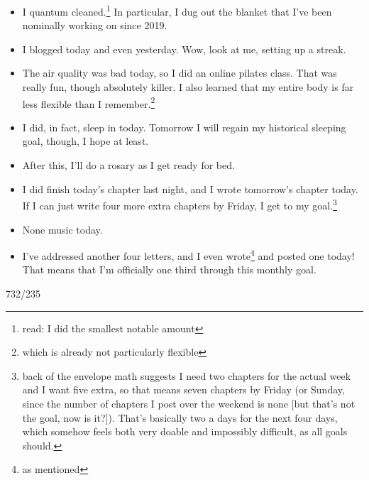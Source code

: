 \documentclass[12pt]{article}[titlepage]
\newcommand{\1}{\={a}}
\newcommand{\2}{\={e}}
\newcommand{\3}{\={\i}}
\newcommand{\4}{\=o}
\newcommand{\5}{\=u}
\newcommand{\6}{\={A}}
\renewcommand{\,}{\textsuperscript{,}}
\begin{document}
\begin{itemize}
\item I quantum cleaned.\footnote{read: I did the smallest notable amount} In particular, I dug out the blanket that I've been nominally working on since 2019.
\item I blogged today and even yesterday. Wow, look at me, setting up a streak.
\item The air quality was bad today, so I did an online pilates class. That was really fun, though absolutely killer. I also learned that my entire body is far less flexible than I remember.\footnote{which is already not particularly flexible}
\item I did, in fact, sleep in today. Tomorrow I will regain my historical sleeping goal, though, I hope at least.
\item After this, I'll do a rosary as I get ready for bed.
\item I did finish today's chapter last night, and I wrote tomorrow's chapter today. If I can just write four more extra chapters by Friday, I get to my goal.\footnote{back of the envelope math suggests I need two chapters for the actual week and I want five extra, so that means seven chapters by Friday (or Sunday, since the number of chapters I post over the weekend is none [but that's not the goal, now is it?]). That's basically two a days for the next four days, which somehow feels both very doable and impossibly difficult, as all goals should.}
\item None music today.
\item I've addressed another four letters, and I even wrote\footnote{as mentioned} and posted one today! That means that I'm officially one third through this monthly goal.
\end{itemize}

732/235
\end{document}
